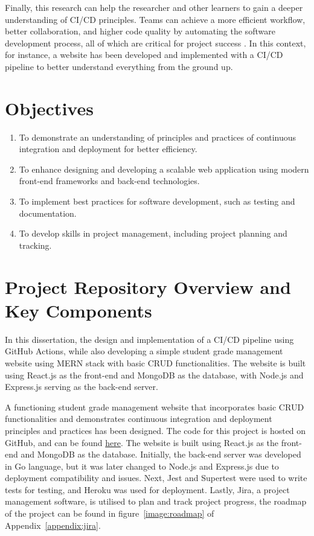 Finally, this research can help the researcher and other learners to gain a deeper understanding of CI/CD principles. Teams can achieve a more efficient workflow, better collaboration, and higher code quality by automating the software development process, all of which are critical for project success \cite{sander}. In this context, for instance, a website has been developed and implemented with a CI/CD pipeline to better understand everything from the ground up.

\section{Objectives}
\begin{enumerate}
  \item To demonstrate an understanding of principles and practices of continuous integration and deployment for better efficiency.
  \item To enhance designing and developing a scalable web application using modern front-end frameworks and back-end technologies.
  \item To implement best practices for software development, such as testing and documentation.
  \item To develop skills in project management, including project planning and tracking.
\end{enumerate}

\section{Project Repository Overview and Key Components}
In this dissertation, the design and implementation of a CI/CD pipeline using GitHub Actions, while also developing a simple student grade management website using MERN stack with basic CRUD functionalities. The website is built using React.js as the front-end and MongoDB as the database, with Node.js and Express.js serving as the back-end server.

A functioning student grade management website that incorporates basic CRUD functionalities and demonstrates continuous integration and deployment principles and practices has been designed. The code for this project is hosted on GitHub, and can be found \href{https://github.com/gabhang/final-year-project}{here}. The website is built using React.js as the front-end and MongoDB as the database. Initially, the back-end server was developed in Go language, but it was later changed to Node.js and Express.js due to deployment compatibility and issues. Next, Jest and Supertest were used to write tests for testing, and Heroku was used for deployment. Lastly, Jira, a project management software, is utilised to plan and track project progress, the roadmap of the project can be found in figure~\ref{image:roadmap} of Appendix~\ref{appendix:jira}.

